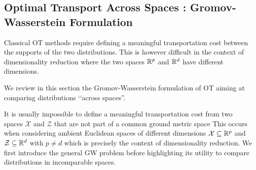 \subsection{Optimal Transport Across Spaces : Gromov-Wasserstein Formulation}

Classical OT methods require defining a meaningful transportation cost between the supports of the two distributions. 
This is however difficult in the context of dimensionality reduction where the two spaces $\mathbb{R}^p$ and $\mathbb{R}^d$ have different dimensions.

We review in this section the Gromov-Wasserstein formulation of OT aiming at comparing distributions ‘‘across spaces''.

It is usually impossible to define a meaningful transportation cost from two spaces $\mathcal{X}$ and $\mathcal{Z}$ that are not part of a common ground metric space
This occurs when considering ambient Euclidean spaces of different dimensions \ie $\mathcal{X} \subseteq \mathbb{R}^p$ and $\mathcal{Z} \subseteq \mathbb{R}^d$ with $p \neq d$ which is precisely the context of dimensionality reduction.
We first introduce the general GW problem before highlighting its utility to compare distributions in incomparable spaces.

